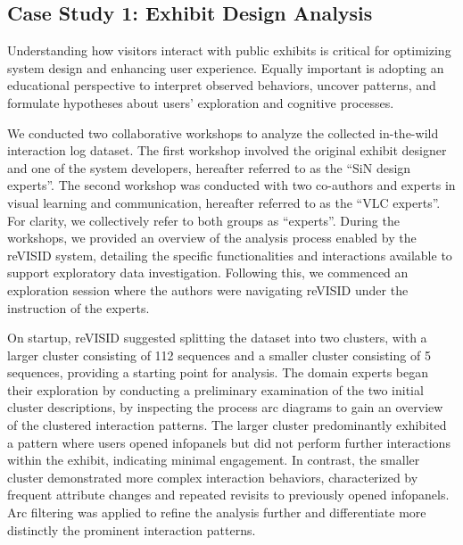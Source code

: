 \documentclass[preprint,journal]{vgtc}            %
\begin{document}
\subsection{Case Study 1: Exhibit Design Analysis}

Understanding how visitors interact with public exhibits is critical for optimizing system design and enhancing user experience. 
Equally important is adopting an educational perspective to interpret observed behaviors, uncover patterns, and formulate hypotheses about users' exploration and cognitive processes.

We conducted two collaborative workshops to analyze the collected in-the-wild interaction log dataset.
The first workshop involved the original exhibit designer and one of the system developers, hereafter referred to as the ``SiN design experts''.
The second workshop was conducted with two co-authors and experts in visual learning and communication, hereafter referred to as the ``VLC experts''. 
For clarity, we collectively refer to both groups as ``experts''.
During the workshops, we provided an overview of the analysis process enabled by the reVISID system, detailing the specific functionalities and interactions available to support exploratory data investigation. 
Following this, we commenced an exploration session where the authors were navigating reVISID under the instruction of the experts.

On startup, reVISID suggested splitting the dataset into two clusters, with a larger cluster consisting of 112 sequences and a smaller cluster consisting of 5 sequences, providing a starting point for analysis.
The domain experts began their exploration by conducting a preliminary examination of the two initial cluster descriptions, by inspecting the process arc diagrams to gain an overview of the clustered interaction patterns.
The larger cluster predominantly exhibited a pattern where users opened infopanels but did not perform further interactions within the exhibit, indicating minimal engagement.
In contrast, the smaller cluster demonstrated more complex interaction behaviors, characterized by frequent attribute changes and repeated revisits to previously opened infopanels.
Arc filtering was applied to refine the analysis further and differentiate more distinctly the prominent interaction patterns.
\end{document}

